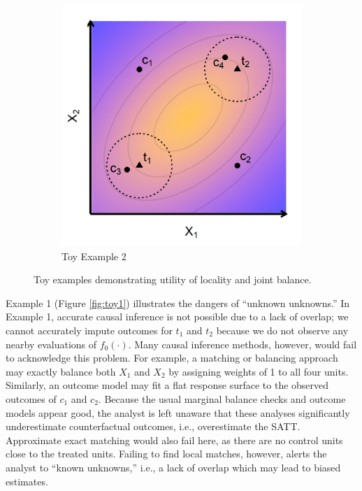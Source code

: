 \documentclass{article}
\begin{document}
\begin{figure}[t]
\begin{subfigure}[ht]{0.4\textwidth}
         \includegraphics[width=\textwidth]{writeup/figures/toyexample2.png}
         \caption{Toy Example 2}
         \label{fig:toy2}
     \end{subfigure}
    \caption{Toy examples demonstrating utility of locality and joint balance.}
    \label{fig:toy}
\end{figure}

Example 1 (Figure \ref{fig:toy1}) illustrates the dangers of ``unknown unknowns.''
In Example 1, accurate causal inference is not possible due to a lack of overlap; we cannot accurately impute outcomes for $t_1$ and $t_2$ because we do not observe any nearby evaluations of $f_0(\cdot)$.
Many causal inference methods, however, would fail to acknowledge this problem.
For example, a matching or balancing approach may exactly balance both $X_1$ and $X_2$ by assigning weights of 1 to all four units.
Similarly, an outcome model may fit a flat response surface to the observed outcomes of $c_1$ and $c_2$.
Because the usual marginal balance checks and outcome models appear good, the analyst is left unaware that these analyses significantly underestimate counterfactual outcomes, i.e., overestimate the SATT.
Approximate exact matching would also fail here, as there are no control units close to the treated units.
Failing to find local matches, however, alerts the analyst to ``known unknowns,'' i.e., a lack of overlap which may lead to biased estimates.
\end{document}
